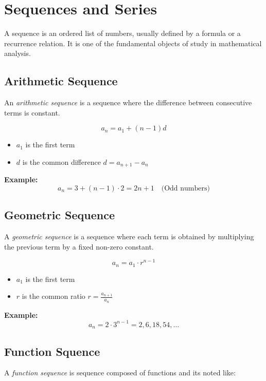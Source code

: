 \section{Sequences and Series}

A sequence is an ordered list of numbers, usually defined by a formula or a recurrence relation. It is one of the fundamental objects of study in mathematical analysis.

\subsection{Arithmetic Sequence}

An \emph{arithmetic sequence} is a sequence where the difference between consecutive terms is constant.

\[
a_n = a_1 + (n - 1)d
\]

\begin{itemize}[label=\(-\)]
\item \(a_1\) is the first term
\item \(d\) is the common difference \(d = a_{n + 1} - a_{n}\)
\end{itemize}

\textbf{Example:}
\[
a_n = 3 + (n - 1) \cdot 2 = 2n + 1 \quad \text{(Odd numbers)}
\]

\subsection{Geometric Sequence}

A \emph{geometric sequence} is a sequence where each term is obtained by multiplying the previous term by a fixed non-zero constant.

\[
a_n = a_1 \cdot r^{n-1}
\]

\begin{itemize}[label=\(-\)]
\item \(a_1\) is the first term
\item \(r\) is the common ratio \(r = \frac{a_{n + 1}}{a_n}\)
\end{itemize}

\textbf{Example:}
\[
a_n = 2 \cdot 3^{n-1} = 2, 6, 18, 54, \dots
\]

\subsection{Function Squence}

A \emph{function sequence} is sequence composed of functions and its noted like:

